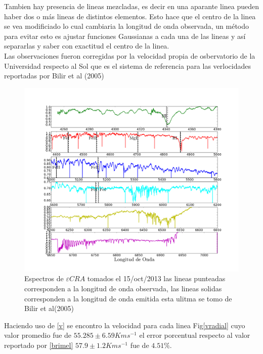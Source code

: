 \documentclass[Proceedings]{ascelike}
\begin{document}
Tambien hay presencia de lineas mezcladas, es decir en una aparante linea pueden haber dos o m\'as lineas de distintos 
elementos. Esto hace que el centro de la linea se vea modificiado lo cual cambiaria la longitud de onda observada, 
un m\'etodo para evitar esto es ajustar funciones Gaussianas a cada una de las lineas y as\'i separarlas y saber con exactitud el centro de la linea.\\ 

Las observaciones fueron corregidas por la velocidad propia de osbervatorio de la Universidad respecto al Sol que es el sistema de referencia para las verlocidades reportadas por Bilir et al (2005) 

\begin{figure}
\includegraphics[scale=0.3]{spectra.png}
\caption{Espectros de $\varepsilon CRA$ tomados el 15/oct/2013
las lineas punteadas corresponden a la longitud de onda observada, las 
lineas solidas corresponden a la longitud de onda emitida esta ulitma se tomo de Bilir et al(2005)\label{espectra}}
\end{figure}

Haciendo uso de \eqref{v} se encontro la velocidad para cada linea Fig\ref{vradial} cuyo valor promedio fue de $55.285 \pm 6.59 Km s^{-1}$ el error porcentual respecto al valor reportado por \ref{brimel} $57.9 \pm 1.2 Kms^{-1}$ fue de $4.51\%$. \\
\end{document}
